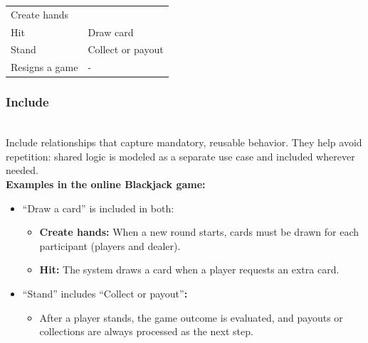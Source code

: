 \begin{center}
{\begin{longtable}[]{@{}
>{\raggedright\arraybackslash} p{}
>{\raggedright\arraybackslash} p{}@{}}
\begin{minipage}[t]{\linewidth}
Create hands
\end{minipage} \\
\begin{minipage}[t]{\linewidth}\raggedright
Hit
\end{minipage} & \begin{minipage}[t]{\linewidth}\raggedright
Draw card
\end{minipage} \\
\begin{minipage}[t]{\linewidth}\raggedright
Stand
\end{minipage} & \begin{minipage}[t]{\linewidth}\raggedright
Collect or payout
\end{minipage} \\
\begin{minipage}[t]{\linewidth}\raggedright
Resigns a game
\end{minipage} & \begin{minipage}[t]{\linewidth}\raggedright
-
\end{minipage} \\
\end{longtable}
}
\end{center}

\subsubsection{Include}\label{qxqhLC0efO3tk7A4JhCvF}
\\
Include relationships that capture mandatory, reusable behavior. They help avoid repetition: shared logic is modeled as a separate use case and included wherever needed.
\\
\textbf{Examples in the online Blackjack game:}

\begin{itemize}
\item
``Draw a card'' is included in both:

\begin{itemize}
\item
\textbf{Create hands:} When a new round starts, cards must be drawn for each participant (players and dealer).
\item
\textbf{Hit:} The system draws a card when a player requests an extra card.
\end{itemize}
\item
``Stand'' includes ``Collect or payout''\textbf{:}

\begin{itemize}
\item
After a player stands, the game outcome is evaluated, and payouts or collections are always processed as the next step.
\end{itemize}
\end{itemize}

